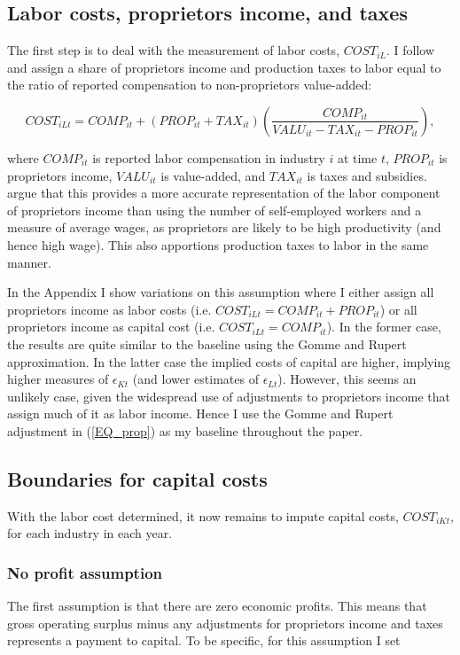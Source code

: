 \documentclass[11pt]{article}
\begin{document}
\subsection{Labor costs, proprietors income, and taxes}
The first step is to deal with the measurement of labor costs, $COST_{iL}$. I follow \cite{gommerupert2004} and assign a share of proprietors income and production taxes to labor equal to the ratio of reported compensation to non-proprietors value-added:

\begin{equation}
	COST_{iLt} = COMP_{it} + (PROP_{it} + TAX_{it})\left(\frac{COMP_{it}}{VALU_{it}-TAX_{it}-PROP_{it}}\right), \label{EQ_prop}
\end{equation}

where $COMP_{it}$ is reported labor compensation in industry $i$ at time $t$, $PROP_{it}$ is proprietors income, $VALU_{it}$ is value-added, and $TAX_{it}$ is taxes and subsidies. \cite{gommerupert2004} argue that this provides a more accurate representation of the labor component of proprietors income than using the number of self-employed workers and a measure of average wages, as proprietors are likely to be high productivity (and hence high wage). This also apportions production taxes to labor in the same manner.

In the Appendix I show variations on this assumption where I either assign all proprietors income as labor costs (i.e. $COST_{iLt} = COMP_{it} + PROP_{it}$) or all proprietors income as capital cost (i.e. $COST_{iLt} = COMP_{it}$). In the former case, the results are quite similar to the baseline using the Gomme and Rupert approximation. In the latter case the implied costs of capital are higher, implying higher measures of $\epsilon_{Kt}$ (and lower estimates of $\epsilon_{Lt}$). However, this seems an unlikely case, given the widespread use of adjustments to proprietors income that assign much of it as labor income. Hence I use the Gomme and Rupert adjustment in (\ref{EQ_prop}) as my baseline throughout the paper.

\subsection{Boundaries for capital costs}
With the labor cost determined, it now remains to impute capital costs, $COST_{iKt}$, for each industry in each year.

\subsubsection{No profit assumption}
The first assumption is that there are zero economic profits. This means that gross operating surplus minus any adjustments for proprietors income and taxes represents a payment to capital. To be specific, for this assumption I set
\end{document}
